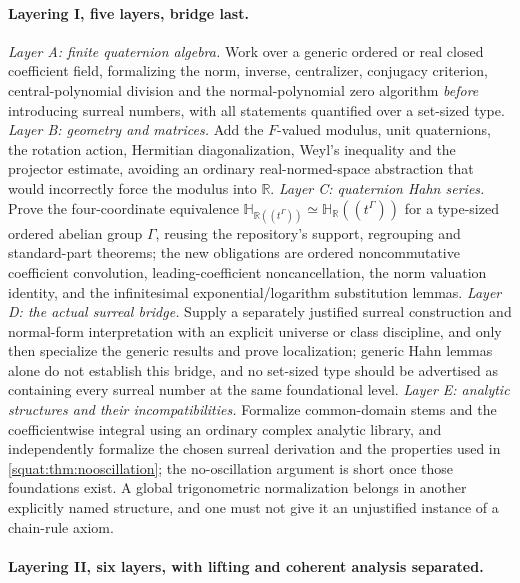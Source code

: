 \documentclass[11pt,letterpaper]{article}
\numberwithin{equation}{section}
\theoremstyle{definition}
\theoremstyle{remark}
\newcommand{\HR}{\mathbb H_{\mathbb R}}
\newcommand{\R}{\mathbb R}
\begin{document}
\paragraph{Layering I, five layers, bridge last.}
\emph{Layer A: finite quaternion algebra.} Work over a generic ordered or real closed
coefficient field, formalizing the norm, inverse, centralizer, conjugacy criterion,
central-polynomial division and the normal-polynomial zero algorithm \emph{before}
introducing surreal numbers, with all statements quantified over a set-sized type.
\emph{Layer B: geometry and matrices.} Add the $F$-valued modulus, unit quaternions, the
rotation action, Hermitian diagonalization, Weyl's inequality and the projector estimate,
avoiding an ordinary real-normed-space abstraction that would incorrectly force the modulus
into $\R$. \emph{Layer C: quaternion Hahn series.} Prove the four-coordinate equivalence
$\mathbb H_{\R((t^\Gamma))}\simeq\HR((t^\Gamma))$ for a type-sized ordered abelian group
$\Gamma$, reusing the repository's support, regrouping and standard-part theorems; the new
obligations are ordered noncommutative coefficient convolution, leading-coefficient
noncancellation, the norm valuation identity, and the infinitesimal
exponential/logarithm substitution lemmas. \emph{Layer D: the actual surreal bridge.}
Supply a separately justified surreal construction and normal-form interpretation with an
explicit universe or class discipline, and only then specialize the generic results and
prove localization; generic Hahn lemmas alone do not establish this bridge, and no
set-sized type should be advertised as containing every surreal number at the same
foundational level. \emph{Layer E: analytic structures and their incompatibilities.}
Formalize common-domain stems and the coefficientwise integral using an ordinary complex
analytic library, and independently formalize the chosen surreal derivation and the
properties used in \cref{squat:thm:nooscillation}; the no-oscillation argument is short
once those foundations exist. A global trigonometric normalization belongs in another
explicitly named structure, and one must not give it an unjustified instance of a
chain-rule axiom.

\paragraph{Layering II, six layers, with lifting and coherent analysis separated.}
\end{document}
